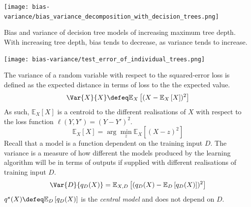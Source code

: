 \documentclass[
	twoside=false, %
]{kaobook}
\begin{document}
\begin{marginfigure} 
  \label{fig:bias-variance-tradeoff}
    \texttt{[image: bias-variance/bias\_variance\_decomposition\_with\_decision\_trees.png]}
    \caption{Bias and variance of decision tree models of increasing maximum tree depth. With increasing tree depth,  bias tends to decrease, as  variance tends to increase.}
\end{marginfigure}


\begin{marginfigure} \label{fig:variance-trees}
    \texttt{[image: bias-variance/test\_error\_of\_individual\_trees.png]}
    \caption{
    Visualising the variance of \tikzcircle[fill=blue]{3pt} decision tree and \tikzcircle[fill=orange]{3pt} Random Forest models. Each glyph corresponds to the test error of one model trained on a random subset of the full available data. The variation of the test error around the mean test error across many dataset samples is exactly the variance.
    Not only do Random Forests show lower test errors on average, they also have lower variance.
    }
\end{marginfigure}


The variance of a random variable with respect to the squared-error loss is defined as the expected distance in terms of loss to the the expected value.
$$
\Var{X}{X} \defeq \mathbb{E}_{X}\left[ (X - \mathbb{E}_{X}\left[ X \right] )^2 \right]
$$
As such, $\mathbb{E}_{X}\left[ X \right]$ is a centroid to the different realisations of $X$ with respect to the loss function $\ell(Y, Y') = (Y-Y')^2$.
$$
\mathbb{E}_{X}\left[ X \right] = \arg\min _{z} \mathbb{E}_{X}\left[ (X-z)^2 \right] 
$$
Recall that a model is a function dependent on the training input $D$. The variance is a measure of how different the models produced by the learning algorithm will be in terms of outputs if supplied with different realisations of training input $D$.
$$
\Var{D}{q_{D}(X)} = \mathbb{E}_{X,D}\left[ (q_{D}(X) - \mathbb{E}_{D}\left[ q_{D}(X) \right] )^2 \right] 
$$
$q^\star(X) \defeq \mathbb{E}_{D}\left[ q_{D}(X) \right]$ is the \textit{central model} and does not depend on $D$.
\end{document}

